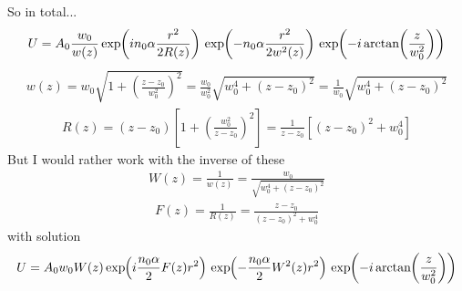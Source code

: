 So in total...
\begin{equation}
\begin{split}
   U  = A_0\frac{w_0}{w(z)} \exp{in_0 \alpha\frac{r^2}{2 R(z)}} \exp{-n_0 \alpha\frac{r^2}{2w^2(z)}} \exp{-i \atan{ \frac{z}{w_0^2} } }
\end{split}
\end{equation}
\begin{equation}
\begin{split}
   w(z) = w_0 \sqrt{1+\left(\frac{z-z_0}{w_0^2}\right)^2} 
   = \frac{w_0}{w_0^2} \sqrt{w_0^4+\left(z-z_0\right)^2} = \frac{1}{w_0} \sqrt{w_0^4+\left(z-z_0\right)^2}
\end{split}
\end{equation}
\begin{equation}
\begin{split}
   R(z) = (z-z_0)\left[1 + \left(\frac{w_0^2}{z-z_0}\right)^2\right] = \frac{1}{z-z_0} \left[(z-z_0)^2 + w_0^4\right] 
\end{split}
\end{equation}
But I would rather work with the inverse of these
\begin{equation}
\begin{split}
   W(z) = \frac{1}{w(z)} = \frac{w_0}{\sqrt{w_0^4+\left(z-z_0\right)^2}} 
\end{split}
\end{equation}
\begin{equation}
\begin{split}
   F(z) = \frac{1}{R(z)} = \frac{z-z_0}{(z-z_0)^2 + w_0^4}
\end{split}
\end{equation}
with solution 
\begin{equation}
\begin{split}
   U  = A_0 w_0 W(z) \exp{i\frac{n_0 \alpha}{2} F(z) r^2} \exp{- \frac{n_0 \alpha}{2} W^2(z) r^2} \exp{-i \atan{ \frac{z}{w_0^2} } }
\end{split}
\end{equation}

